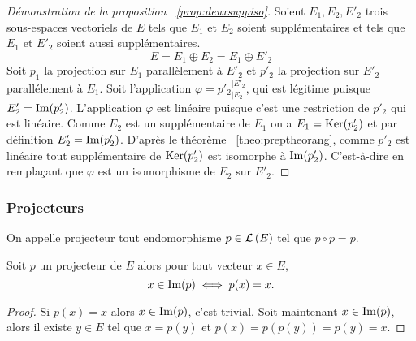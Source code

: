 \begin{proof}[Démonstration de la proposition~
  \ref{prop:deuxsuppiso}]
  Soient \(E_1, E_2, E'_2\) trois sous-espaces vectoriels de \(E\) tels que 
  \(E_1\) et \(E_2\) soient supplémentaires et tels que \(E_1\) et \(E'_2\) 
  soient aussi supplémentaires.
  \begin{equation}
    E=E_1 \oplus E_2 = E_1 \oplus E'_2
  \end{equation}
  Soit \(p_1\) la projection sur \(E_1\) parallèlement à \(E'_2\) et \(p'_2\) la 
  projection sur \(E'_2\) parallélement à \(E_1\). Soit l'application 
  \(\varphi={p'_2}_{|E_2}^{|E'_2}\), qui est légitime puisque 
  \(E'_2=\operatorname{Im}(p'_2)\). L'application \(\varphi\) est linéaire puisque c'est 
  une restriction de \(p'_2\) qui est linéaire. Comme \(E_2\) est un 
  supplémentaire de \(E_1\) on a \(E_1 = \operatorname{Ker}(p'_2)\) et par définition \(E'_2 = 
  \operatorname{Im}(p'_2)\). D'après le théorème~
  \ref{theo:preptheorang}, comme \(p'_2\) est linéaire tout supplémentaire de 
  \(\operatorname{Ker}(p'_2)\) est isomorphe à \(\operatorname{Im}(p'_2)\). C'est-à-dire en remplaçant 
  que \(\varphi\) est un isomorphisme de \(E_2\) sur \(E'_2\).
\end{proof}

\subsubsection{Projecteurs}

\begin{defdef}
  On appelle projecteur tout endomorphisme \(p \in \mathcal{L}\left(E\right)\) tel que \(p \circ 
  p=p\).
\end{defdef}

\begin{prop}\label{prop:caracimageproj}
  Soit \(p\) un projecteur de \(E\) alors pour tout vecteur \(x \in E\),
  \begin{equation}
    x \in \operatorname{Im}(p) \iff p(x)=x.
  \end{equation}
\end{prop}
\begin{proof}
  Si \(p(x)=x\) alors \(x \in \operatorname{Im}(p)\), c'est trivial. Soit maintenant \(x 
  \in \operatorname{Im}(p)\), alors il existe \(y \in E\) tel que \(x=p(y)\) et 
  \(p(x)=p(p(y))=p(y)=x\).
\end{proof}

